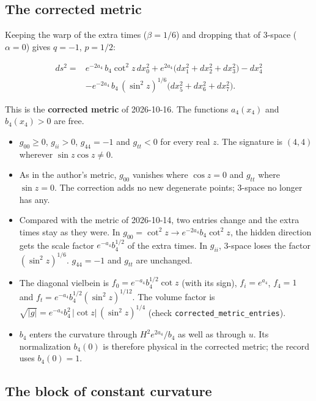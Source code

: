 \documentclass[11pt]{article}
\begin{document}
\subsection{The corrected metric}

Keeping the warp of the extra times ($\beta = 1/6$) and dropping that of 3-space ($\alpha = 0$) gives $q = -1$, $p = 1/2$:

\[
\begin{aligned}
ds^2 = {} & e^{-2a_4}\,b_4\cot^2 z\,dx_0^2 + e^{2a_4}\big(dx_1^2 + dx_2^2 + dx_3^2\big) - dx_4^2 \\
& - e^{-2a_4}\,b_4\,(\sin^2 z)^{1/6}\big(dx_5^2 + dx_6^2 + dx_7^2\big) .
\end{aligned}
\]

This is the \textbf{corrected metric} of 2026-10-16. The functions $a_4(x_4)$ and $b_4(x_4) > 0$ are free.

\begin{itemize}
\item $g_{00} \ge 0$, $g_{ii} > 0$, $g_{44} = -1$ and $g_{tt} < 0$ for every real $z$. The signature is $(4,4)$ wherever $\sin z\cos z \neq 0$.
\item As in the author's metric, $g_{00}$ vanishes where $\cos z = 0$ and $g_{tt}$ where $\sin z = 0$. The correction adds no new degenerate points; 3-space no longer has any.
\item Compared with the metric of 2026-10-14, two entries change and the extra times stay as they were. In $g_{00} = \cot^2 z \to e^{-2a_4}b_4\cot^2 z$, the hidden direction gets the scale factor $e^{-a_4}b_4^{1/2}$ of the extra times. In $g_{ii}$, 3-space loses the factor $(\sin^2 z)^{1/6}$. $g_{44} = -1$ and $g_{tt}$ are unchanged.
\item The diagonal vielbein is $f_0 = e^{-a_4}b_4^{1/2}\cot z$ (with its sign), $f_i = e^{a_4}$, $f_4 = 1$ and $f_t = e^{-a_4}b_4^{1/2}(\sin^2 z)^{1/12}$. The volume factor is $\sqrt{|g|} = e^{-a_4}b_4^2\,|\cot z|\,(\sin^2 z)^{1/4}$ (check \texttt{correcte\allowbreak{}d\_metric\allowbreak{}\_entries}).
\item $b_4$ enters the curvature through $H^2e^{2a_4}/b_4$ as well as through $u$. Its normalization $b_4(0)$ is therefore physical in the corrected metric; the record uses $b_4(0) = 1$.
\end{itemize}

\subsection{The block of constant curvature}
\end{document}
